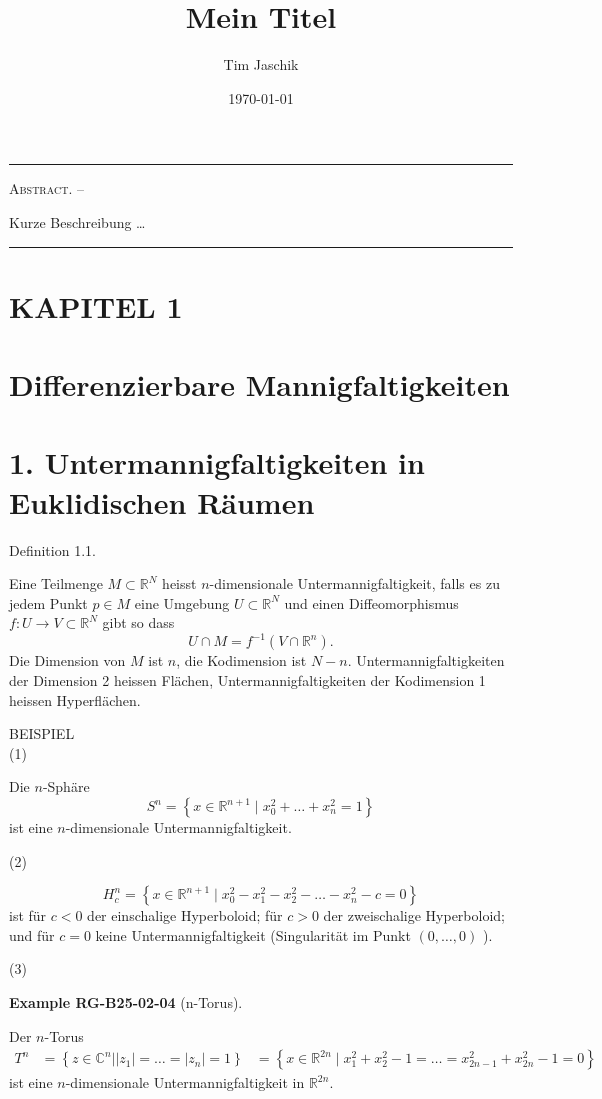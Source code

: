 \documentclass[10pt, letterpaper]{article}
\title{Mein Titel}
\author{Tim Jaschik}
\date{\today}
\renewenvironment{abstract}
  {
    \begin{adjustwidth}{1.5cm}{1.5cm}
    \small
    \textsc{Abstract. –}%
  }
  {
    \end{adjustwidth}
  }
\newcommand{\CustomHeading}[3]{%
  \par\medskip\noindent%
  \textbf{#1 #2} \textnormal{(#3)}.\enskip%
}
\newenvironment{EXA}[2]{\begin{unitbox}\CustomHeading{Example}{#1}{#2}}{\end{unitbox}}
\begin{document}
\maketitle
\rule{\textwidth}{0.5pt}
\begin{abstract}
Kurze Beschreibung …
\end{abstract}
\rule{\textwidth}{0.5pt}
\vspace{0.5cm}

\tableofcontents

\pagebreak


\section*{KAPITEL 1}
\section*{Differenzierbare Mannigfaltigkeiten}
\section*{1. Untermannigfaltigkeiten in Euklidischen Räumen}
Definition 1.1. 

Eine Teilmenge $M \subset \mathbb{R}^{N}$ heisst $n$-dimensionale Untermannigfaltigkeit, falls es zu jedem Punkt $p \in M$ eine Umgebung $U \subset \mathbb{R}^{N}$ und einen Diffeomorphismus $f: U \rightarrow V \subset \mathbb{R}^{N}$ gibt so dass
$$
U \cap M=f^{-1}\left(V \cap \mathbb{R}^{n}\right) .
$$
Die Dimension von $M$ ist $n$, die Kodimension ist $N-n$. Untermannigfaltigkeiten der Dimension 2 heissen Flächen, Untermannigfaltigkeiten der Kodimension 1 heissen Hyperflächen.



BEISPIEL\\
(1) 


Die $n$-Sphäre
$$
S^{n}=\left\{x \in \mathbb{R}^{n+1} \mid x_{0}^{2}+\ldots+x_{n}^{2}=1\right\}
$$
ist eine $n$-dimensionale Untermannigfaltigkeit.


(2)

$$
H_{c}^{n}=\left\{x \in \mathbb{R}^{n+1} \mid x_{0}^{2}-x_{1}^{2}-x_{2}^{2}-\ldots-x_{n}^{2}-c=0\right\}
$$
ist für $c<0$ der einschalige Hyperboloid; für $c>0$ der zweischalige Hyperboloid; und für $c=0$ keine Untermannigfaltigkeit (Singularität im Punkt $(0, \ldots, 0)$ ).


(3) 



\begin{EXA}{RG-B25-02-04}{n-Torus}
Der $n$-Torus
$$
\begin{aligned}
T^{n} & =\left\{z \in \mathbb{C}^{n}| | z_{1}\left|=\ldots=\left|z_{n}\right|=1\right\}\right.
& =\left\{x \in \mathbb{R}^{2 n} \mid x_{1}^{2}+x_{2}^{2}-1=\ldots=x_{2 n-1}^{2}+x_{2 n}^{2}-1=0\right\}
\end{aligned}
$$
ist eine $n$-dimensionale Untermannigfaltigkeit in $\mathbb{R}^{2 n}$.
\end{EXA}
\end{document}

